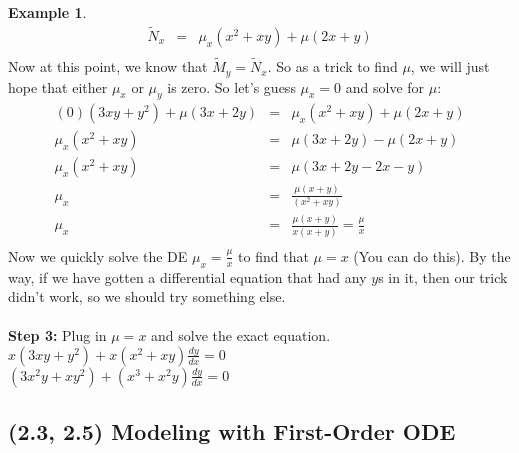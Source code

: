 \documentclass[a5paper]{article}
\theoremstyle{definition}%
\newtheorem*{example*}{Example}
\numberwithin{exercise}{section}
\theoremstyle{remark}%
\begin{document}
\begin{highlight}
\begin{example*}
\[\begin{array}{rcl}
\widetilde{N}_x &=& \mu_x(x^2+xy)+\mu(2x+y)\\
\end{array}\]
Now at this point, we know that $\widetilde{M}_y=\widetilde{N}_x$. So as a trick to find $\mu$, we will just hope that either $\mu_x$ or $\mu_y$ is zero. So let's guess $\mu_x=0$ and solve for $\mu$:
\[\begin{array}{rcl}
(0)(3xy+y^2)+\mu(3x+2y) &=& \mu_x(x^2+xy)+\mu(2x+y)\\
\mu_x(x^2+xy) &=& \mu(3x+2y) -\mu(2x+y) \\
\mu_x(x^2+xy) &=& \mu(3x+2y-2x-y) \\
\mu_x  &=& \frac{\mu(x+y)}{(x^2+xy)} \\
\mu_x  &=& \frac{\mu(x+y)}{x(x+y)} =\frac{\mu}{x}\\
\end{array}\]
Now we quickly solve the DE $\mu_x=\frac{\mu}{x}$ to find that $\mu=x$ (You can do this). By the way, if we have gotten a differential equation that had any $y$s in it, then our trick didn't work, so we should try something else. \\
\mbox{}\\
\textbf{Step 3:}
Plug in $\mu=x$ and solve the exact equation.\\
$x(3xy+y^2)+x(x^2+xy)\frac{dy}{dx}=0$\\
$(3x^2y+xy^2)+(x^3+x^2y)\frac{dy}{dx}=0$\\
\end{example*}
\end{highlight}

\subsection{(2.3, 2.5) Modeling with First-Order ODE}
\end{document}
